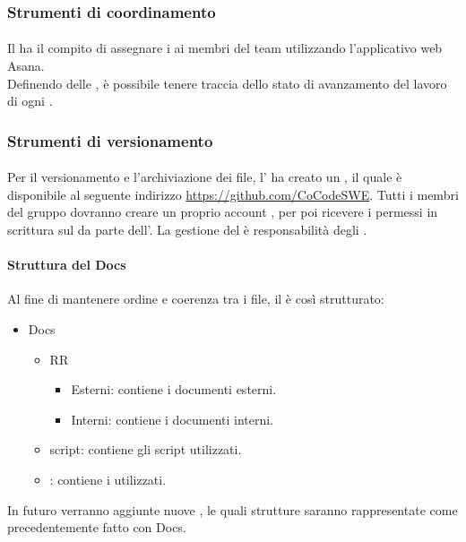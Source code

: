 \subsubsection{Strumenti di coordinamento}
 \paragraph{}
 Il \RESP{} ha il compito di assegnare i  ai membri del team utilizzando l'applicativo web Asana. \\
 Definendo delle , è possibile tenere traccia dello stato di avanzamento del lavoro di ogni .
 
\subsubsection{Strumenti di versionamento}
 \paragraph{}
 Per il versionamento e l'archiviazione dei file, l'\AMM{} ha creato un  , il quale è disponibile al seguente indirizzo \url{https://github.com/CoCodeSWE}. Tutti i membri del gruppo dovranno creare un proprio account , per poi ricevere i permessi in scrittura sul  da parte dell'\AMM.
 La gestione del  è responsabilità degli \AMMP.
 \paragraph{Struttura del  Docs}
 Al fine di mantenere ordine e coerenza tra i file, il  è così strutturato:
 \begin{itemize}
  \item Docs
   \begin{itemize}
    \item RR
     \begin{itemize}
      \item Esterni: contiene i documenti esterni.
      \item Interni: contiene i documenti interni.
     \end{itemize}
     \item script: contiene gli script utilizzati.
     \item {}: contiene i  utilizzati.
    \end{itemize}
   \end{itemize}
In futuro verranno aggiunte nuove , le quali strutture saranno rappresentate come precedentemente fatto con Docs.
